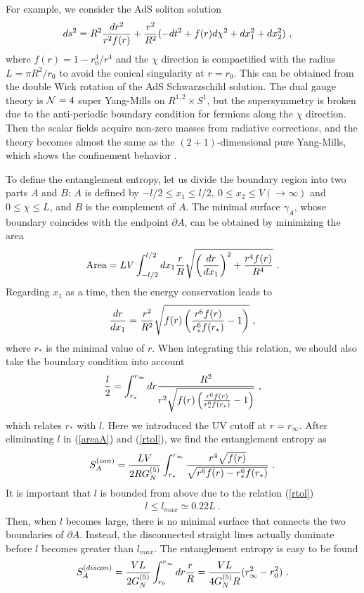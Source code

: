 \documentclass[12pt]{article}
\def\frac#1#2{{#1\over #2}}
\def\g{{\gamma}}
\def\s{\sqrt}
\def\CN{{\cal N}}
\def\p{\partial}
\def\f {\frac}
\def\frac#1#2{{#1\over #2}}
\def\g{{\gamma}}
\def\s{\sqrt}
\def\CN{{\cal N}}
\def\p{\partial}
\begin{document}
For example, we consider the AdS soliton solution \cite{Witten}
\begin{align}
    ds^2 &= R^2\f{dr^2}{r^2 f(r)} + \f{r^2}{R^2} (-dt^2 + f(r) d\chi^2 + dx_1^2 + dx_2^2) \ ,
\end{align}
where $f(r) = 1 - r_0^4/r^4$ and the $\chi$ direction is compactified with the radius $L = \pi R^2/r_0$ to avoid
the conical singularity at $r=r_0$. This can be obtained from the double Wick rotation of the
AdS Schwarzschild solution. The dual gauge theory is $\CN =4$ super Yang-Mills on $R^{1,2}\times
S^1$, but the supersymmetry is broken due to the anti-periodic boundary condition for
fermions along the $\chi$ direction. Then the scalar fields acquire non-zero masses from
radiative corrections, and the theory becomes almost the same as the $(2+1)$-dimensional pure Yang-Mills,
which shows the confinement behavior \cite{Witten}.

To define the entanglement entropy, let us divide the boundary region into two parts $A$ and $B$:
$A$ is defined by $-l/2\le x_1 \le l/2, \ 0\le x_2 \le V(\to \infty)$ and $0\le \chi \le L$, and $B$ is the
complement of $A$.
The minimal surface $\g_A$, whose boundary coincides with the endpoint
$\p A$, can be obtained by minimizing
the area
\begin{align}\label{areaA}
    \text{Area} = LV \int_{-l/2}^{l/2}dx_1 \f{r}{R}\s{\left( \f{dr}{dx_1}\right)^2 + \f{r^4f(r)}{R^4}} \ .
\end{align}
Regarding $x_1$ as a time, then the energy conservation leads to
\begin{align}
    \f{dr}{dx_1} = \f{r^2}{R^2}\s{f(r)\left( \f{r^6f(r)}{r_*^6f(r_*)} - 1 \right)} \ ,
\end{align}
where $r_*$ is the minimal value of $r$.
When integrating this relation, we should also take the
boundary condition into account
\begin{align}\label{rtol}
    \f{l}{2} = \int_{r_*}^{r_\infty} dr \f{R^2}{r^2\s{f(r)\left( \f{r^6f(r)}{r_*^6f(r_*)} - 1 \right)}} \ ,
\end{align}
which relates $r_*$ with $l$. Here we introduced the UV cutoff at $r=r_\infty$.
After eliminating $l$ in (\ref{areaA}) and (\ref{rtol}), we find
the entanglement entropy as
\begin{align}
    S_A^{(con)} = \f{LV}{2RG_N^{(5)}} \int_{r_*}^{r_\infty} \f{r^4\s{f(r)}}{\s{r^6f(r) - r_*^6 f(r_*)}}
    \ .
\end{align}
It is important that $l$ is bounded from above
due to the relation
(\ref{rtol})
\begin{align}
    l \le l_{max} \simeq 0.22L \ .
\end{align}
Then, when $l$ becomes large, there is no minimal surface that connects the two boundaries of $\p A$.
Instead, the disconnected straight lines actually dominate before $l$ becomes greater than $l_{max}$.
The entanglement entropy is easy to be found
\begin{align}
    S_A^{(discon)} = \f{VL}{2G_N^{(5)}}\int_{r_0}^{r_\infty}dr \f{r}{R}
    = \f{VL}{4G_N^{(5)}R}(r_\infty^2 - r_0^2)\ .
\end{align}
\end{document}
